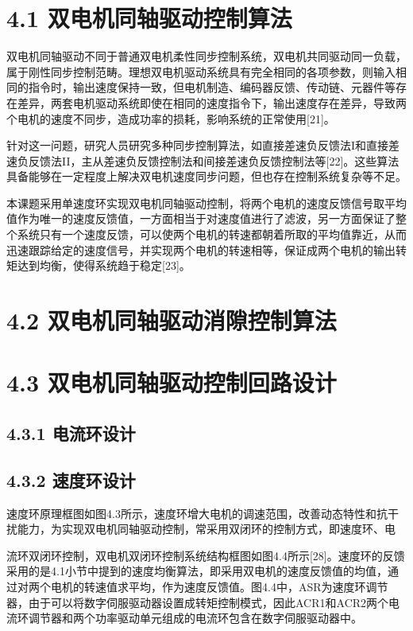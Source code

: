\documentclass[UTF8,zihao=-4,openany,oneside]{ctexbook}
\begin{document}
\section{4.1 双电机同轴驱动控制算法}

双电机同轴驱动不同于普通双电机柔性同步控制系统，双电机共同驱动同一负载，属于刚性同步控制范畴。理想双电机驱动系统具有完全相同的各项参数，则输入相同的指令时，输出速度保持一致，但电机制造、编码器反馈、传动链、元器件等存在差异，两套电机驱动系统即使在相同的速度指令下，输出速度存在差异，导致两个电机的速度不同步，造成功率的损耗，影响系统的正常使用[21]。

针对这一问题，研究人员研究多种同步控制算法，如直接差速负反馈法I和直接差速负反馈法II，主从差速负反馈控制法和间接差速负反馈控制法等[22]。这些算法具备能够在一定程度上解决双电机速度同步问题，但也存在控制系统复杂等不足。

本课题采用单速度环实现双电机同轴驱动控制，将两个电机的速度反馈信号取平均值作为唯一的速度反馈值，一方面相当于对速度值进行了滤波，另一方面保证了整个系统只有一个速度反馈，可以使两个电机的转速都朝着所取的平均值靠近，从而迅速跟踪给定的速度信号，并实现两个电机的转速相等，保证成两个电机的输出转矩达到均衡，使得系统趋于稳定[23]。

\section{4.2 双电机同轴驱动消隙控制算法}

\section{4.3 双电机同轴驱动控制回路设计}

\subsection{4.3.1 电流环设计}

\subsection{4.3.2 速度环设计}

速度环原理框图如图4.3所示，速度环增大电机的调速范围，改善动态特性和抗干扰能力，为实现双电机同轴驱动控制，常采用双闭环的控制方式，即速度环、电

流环双闭环控制，双电机双闭环控制系统结构框图如图4.4所示[28]。速度环的反馈采用的是4.1小节中提到的速度均衡算法，即采用双电机的速度反馈值的均值，通过对两个电机的转速值求平均，作为速度反馈值。图4.4中，ASR为速度环调节器，由于可以将数字伺服驱动器设置成转矩控制模式，因此ACR1和ACR2两个电流环调节器和两个功率驱动单元组成的电流环包含在数字伺服驱动器中。
\end{document}
